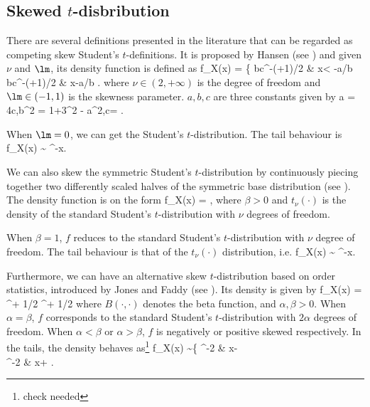 \subsection{Skewed $t$-disbribution}

There are several definitions presented in the literature that can be regarded as competing skew Student's $t$-definitions. It is proposed by Hansen (see \cite{Hansen_1994}) and given $\nu$ and $\lm$, its density function is defined as
\be
f_X(x) = \left\{
bc^{-(\nu+1)/2} \quad\quad & x< -a/b\\
bc^{-(\nu+1)/2} & x\geq -a/b
\ea\right.
\ee
where $\nu\in(2,+\infty)$ is the degree of freedom and $\lm \in (-1,1)$ is the skewness parameter. $a,b,c$ are three constants given by
\be
a = 4\lm c,\quad b^2 = 1+3\lm^2 - a^2,\quad c= .
\ee

When $\lm = 0$, we can get the Student's $t$-distribution. The tail behaviour is
\be
f_X(x) \sim {} ^{-}\quad {}x\to \pm \infty.
\ee

We can also skew the symmetric Student's $t$-distribution by continuously piecing together two differently scaled halves of the symmetric base distribution (see \cite{Fernandez_Steel_1998}). The density function is on the form
\be
f_X(x) = ,
\ee
where $\beta >0$ and $t_\nu(\cdot)$ is the density of the standard Student's $t$-distribution with $\nu$ degrees of freedom.

When $\beta = 1$, $f$ reduces to the standard Student's $t$-distribution with $\nu$ degree of freedom. The tail behaviour is that of the $t_{\nu}(\cdot)$ distribution, i.e.
\be
f_X(x) \sim {} ^{-}\quad {}x\to \pm \infty.
\ee

Furthermore, we can have an alternative skew $t$-distribution based on order statistics, introduced by Jones and Faddy (see \cite{Jones_Faddy_2003}). Its density is given by
\be
f_X(x) = ^{\alpha + 1/2} ^{\beta + 1/2}
\ee
where $B(\cdot,\cdot)$ denotes the beta function, and $\alpha,\beta >0$. When $\alpha=\beta$, $f$ corresponds to the standard Student's $t$-distribution with $2\alpha$ degrees of freedom. When $\alpha <\beta$ or $\alpha >\beta$, $f$ is negatively or positive skewed respectively. In the tails, the density behaves as\footnote{check needed}
\be
f_X(x) \sim \left\{  ^{-2} \quad\quad & x\to -\infty\\
^{-2} \quad\quad & x\to +\infty
\ea\right.
\ee

